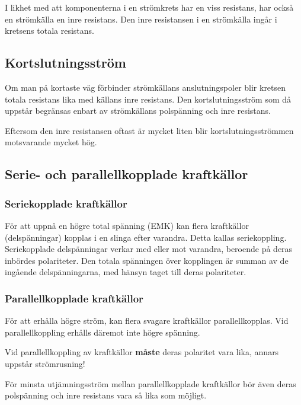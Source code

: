 I likhet med att komponenterna i en strömkrets har en viss resistans, har också en
strömkälla en inre resistans.
Den inre resistansen i en strömkälla ingår i kretsens totala resistans.

\subsection{Kortslutningsström}

Om man på kortaste väg förbinder strömkällans anslutningspoler blir kretsen
totala resistans lika med källans inre resistans. Den kortslutningsström som då
uppstår begränsas enbart av strömkällans polspänning och inre resistans.

Eftersom den inre resistansen oftast är mycket liten blir kortslutningsströmmen
motsvarande mycket hög.

\subsection{Serie- och parallellkopplade kraftkällor}

\subsubsection{Seriekopplade kraftkällor}

För att uppnå en högre total spänning (EMK) kan flera kraftkällor
(delspänningar) kopplas i en slinga efter varandra. Detta kallas seriekoppling.
Seriekopplade delspänningar verkar med eller mot varandra, beroende på deras
inbördes polariteter. Den totala spänningen över kopplingen är summan av de
ingående delspänningarna, med hänsyn taget till deras polariteter.

\subsubsection{Parallellkopplade kraftkällor}

För att erhålla högre ström, kan flera svagare kraftkällor parallellkopplas.
Vid parallellkoppling erhålls däremot inte högre spänning.

Vid parallellkoppling av kraftkällor \textbf{måste} deras polaritet vara lika,
annars uppstår strömrusning!

För minsta utjämningsström mellan parallellkopplade kraftkällor bör även deras
polspänning och inre resistans vara så lika som möjligt.
